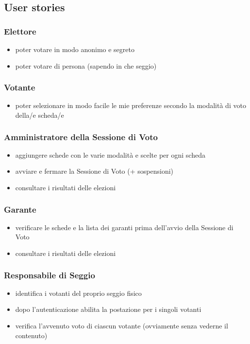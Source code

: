 \documentclass{report}
\begin{document}
\subsection{User stories}

\subsubsection{Elettore}
\begin{itemize}
	\item poter votare in modo anonimo e segreto
	\item poter votare di persona (sapendo in che seggio) 
\end{itemize}
\subsubsection{Votante}
\begin{itemize}
	\item poter selezionare in modo facile le mie preferenze secondo la modalità di voto della/e scheda/e
\end{itemize}
\subsubsection{Amministratore della Sessione di Voto}
\begin{itemize}
	\item aggiungere schede con le varie modalità e scelte per ogni scheda
	\item avviare e fermare la Sessione di Voto (+ sospensioni)
	\item consultare i risultati delle elezioni
\end{itemize}
\subsubsection{Garante}
\begin{itemize}
	\item verificare le schede e la lista dei garanti prima dell'avvio della Sessione di Voto
	\item consultare i risultati delle elezioni
\end{itemize}
\subsubsection{Responsabile di Seggio}
\begin{itemize}
	\item identifica i votanti del proprio seggio fisico
	\item dopo l'autenticazione abilita la postazione per i singoli votanti
	\item verifica l'avvenuto voto di ciascun votante (ovviamente senza vederne il contenuto)
\end{itemize}
\end{document}
